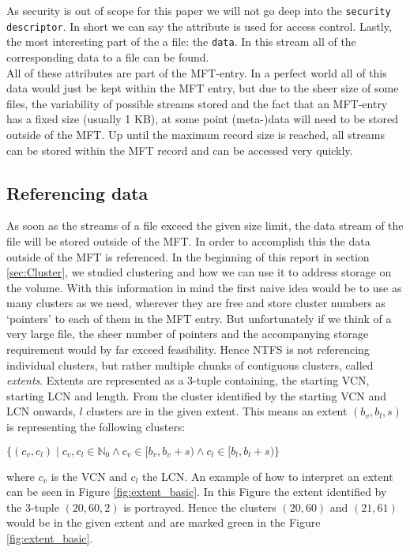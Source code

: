 As security is out of scope for this paper we will not go deep into the \texttt{security descriptor}. In short we can say  the attribute is used for access control.
Lastly, the most interesting part of the a file: the \texttt{data}. In this stream all of the corresponding data to a file can be found.\\
All of these attributes are part of the MFT-entry. In a perfect world all of this data would just be kept within the MFT entry, but due to the sheer size of some files, the variability of possible streams stored and the fact that an MFT-entry has a fixed size (usually 1 KB\cite{B:2017:AJI6}), at some point (meta-)data will need to be stored outside of the MFT. Up until the maximum record size is reached, all streams can be stored within the MFT record and can  be accessed very quickly.
\subsection{Referencing data}
As soon as the streams of a file exceed the given size limit, the data stream of the file will be stored outside of the MFT. In order to accomplish this the data outside of the MFT is referenced. In the beginning of this report in section \ref{sec:Cluster}, we studied clustering and how we can use it to address storage on the volume. With this information in mind the first naive idea would be to use as many clusters as we need, wherever they are free and store cluster numbers as `pointers' to each of them in the MFT entry. But unfortunately if we think of a very large file, the sheer number of pointers and the accompanying storage requirement would by far exceed feasibility. Hence NTFS is not referencing individual clusters, but rather multiple chunks of contiguous clusters, called \textit{extents}. Extents are represented as a 3-tuple containing, the starting VCN, starting LCN and length. From the cluster identified by the starting VCN and LCN onwards, $l$ clusters are in the given extent. This means an extent $(b_v, b_l, s)$ is representing the following clusters:
\begin{center}
	$\{(c_v, c_l) \mid c_v, c_l \in \mathbb{N}_0 \wedge c_v \in [b_v, b_v + s) \wedge c_l \in [b_l, b_l + s)\}$
\end{center}
where $c_v$ is the VCN and $c_l$ the LCN.\cite{miller:2013:CNS} An example of how to interpret an extent can be seen in Figure \ref{fig:extent_basic}. In this Figure the extent identified by the 3-tuple $(20, 60, 2)$ is portrayed. Hence the clusters $(20, 60)$ and $(21, 61)$ would be in the given extent and are marked green in the Figure \ref{fig:extent_basic}.
